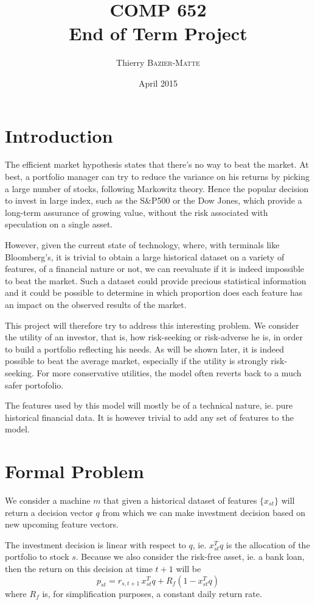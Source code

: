 \documentclass[11pt,fleqn]{article}
\title{COMP 652 \\ End of Term Project}
\author{Thierry \textsc{Bazier-Matte}}
\date{April 2015}
\begin{document}
\maketitle

\section{Introduction}

The efficient market hypothesis states that there's no way to beat the market. At best, a
portfolio manager can try to reduce the variance on his returns by picking a large number
of stocks, following Markowitz theory. Hence the popular decision to invest in large
index, such as the S\&P500 or the Dow Jones, which provide a long-term assurance of
growing value, without the risk associated with speculation on a single asset.

However, given the current state of technology, where, with terminals like Bloomberg's, it
is trivial to obtain a large historical dataset on a variety of features, of a financial
nature or not, we can reevaluate if it is indeed impossible to beat the market. Such a
dataset could provide precious statistical information and it could be possible to
determine in which proportion does each feature has an impact on the observed results of
the market. 

This project will therefore try to address this interesting problem. We consider the
utility of an investor, that is, how risk-seeking or risk-adverse he is, in order to build
a portfolio reflecting his needs. As will be shown later, it is indeed possible to beat
the average market, especially if the utility is strongly risk-seeking. For more
conservative utilities, the model often reverts back to a much safer portofolio. 

The features used by this model will mostly be of a technical nature, ie. pure historical
financial data. It is however trivial to add any set of features to the model.

\section{Formal Problem}

We consider a machine $m$ that given a historical dataset of features $\{x_{st}\}$ will
return a decision vector $q$ from which we can make investment decision based on new
upcoming feature vectors. 

The investment decision is linear with respect to $q$, ie. $x_{st}^Tq$ is the allocation
of the portfolio to stock $s$. Because we also consider the risk-free asset, ie. a bank
loan, then the return on this decision at time $t+1$ will be
\begin{equation*}
  p_{st} = r_{s,t+1}\,x_{st}^Tq + R_f(1-x_{st}^Tq)
\end{equation*}
where $R_f$ is, for simplification purposes, a constant daily return rate. 
\end{document}

